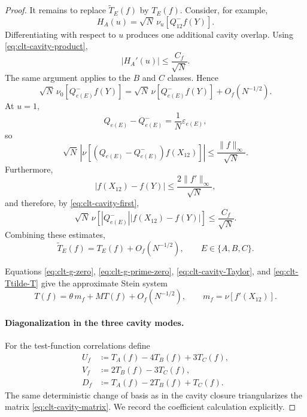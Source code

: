\begin{proof}
It remains to replace $\widetilde T_E(f)$ by $T_E(f)$.  Consider, for
example,
\[
 H_A(u)
 =
 \sqrt N\,\nu_u[Q^-_{12}f(Y)].
\]
Differentiating with respect to $u$ produces one additional cavity overlap.
Using \eqref{eq:clt-cavity-product},
\[
 |H_A'(u)|
 \le
 \frac{C_f}{\sqrt N}.
\]
The same argument applies to the $B$ and $C$ classes.  Hence
\begin{equation}
 \sqrt N\,\nu_0[Q^-_{e(E)}f(Y)]
 =
 \sqrt N\,\nu[Q^-_{e(E)}f(Y)]
 +O_f(N^{-1/2}).
 \label{eq:clt-u-endpoint-replacement}
\end{equation}
At $u=1$,
\[
 Q_{e(E)}-Q^-_{e(E)}
 =
 \frac1N\varepsilon_{e(E)},
\]
so
\[
 \sqrt N\,
 \left|
 \nu[(Q_{e(E)}-Q^-_{e(E)})f(X_{12})]
 \right|
 \le
 \frac{\|f\|_\infty}{\sqrt N}.
\]
Furthermore,
\[
 |f(X_{12})-f(Y)|
 \le
 \frac{2\|f'\|_\infty}{\sqrt N},
\]
and therefore, by \eqref{eq:clt-cavity-first},
\[
 \sqrt N\,
 \nu\!\left[
 |Q^-_{e(E)}|
 |f(X_{12})-f(Y)|
 \right]
 \le
 \frac{C_f}{\sqrt N}.
\]
Combining these estimates,
\begin{equation}
 \widetilde T_E(f)
 =
 T_E(f)+O_f(N^{-1/2}),
 \qquad E\in\{A,B,C\}.
 \label{eq:clt-Ttilde-T}
\end{equation}

Equations \eqref{eq:clt-g-zero},
\eqref{eq:clt-g-prime-zero},
\eqref{eq:clt-cavity-Taylor}, and
\eqref{eq:clt-Ttilde-T} give the approximate Stein system
\begin{equation}
 T(f)
 =
 \theta\,m_f
 +
 M T(f)
 +
 O_f(N^{-1/2}),
 \qquad
 m_f=\nu[f'(X_{12})].
 \label{eq:clt-vector-Stein}
\end{equation}

\paragraph{Diagonalization in the three cavity modes.}
For the test-function correlations define
\begin{align}
 U_f&\coloneqq T_A(f)-4T_B(f)+3T_C(f),
 \label{eq:clt-Uf}\\
 V_f&\coloneqq2T_B(f)-3T_C(f),
 \label{eq:clt-Vf}\\
 D_f&\coloneqq T_A(f)-2T_B(f)+T_C(f).
 \label{eq:clt-Df}
\end{align}
The same deterministic change of basis as in the cavity closure triangularizes
the matrix \eqref{eq:clt-cavity-matrix}.  We record the coefficient
calculation explicitly.


\end{proof}
